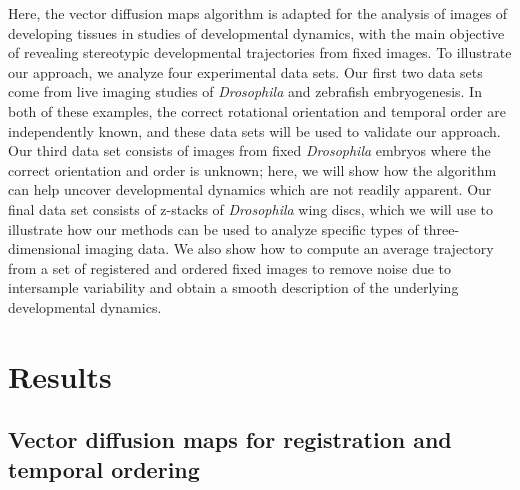 \documentclass[twocolumn, 10pt]{article}
\begin{document}
Here, the vector diffusion maps algorithm is adapted for the analysis of images of developing tissues in studies of developmental dynamics, with the main objective of revealing stereotypic developmental trajectories from fixed images.
%
To illustrate our approach, we analyze four experimental data sets.
%
Our first two data sets come from live imaging studies of {\em Drosophila} and zebrafish embryogenesis.
%
In both of these examples, the correct rotational orientation and temporal order are independently known, and these data sets will be used to validate our approach.
%
Our third data set consists of images from fixed {\em Drosophila} embryos where the correct orientation and order is unknown; here, we will show how the algorithm can help uncover developmental dynamics which are not readily apparent.
%
Our final data set consists of z-stacks of {\em Drosophila} wing discs, which we will use to illustrate how our methods can be used to analyze specific types of three-dimensional imaging data.
%
We also show how to compute an average trajectory from a set of registered and ordered fixed images to remove noise due to intersample variability and obtain a smooth description of the underlying developmental dynamics.

\section*{Results}

\subsection*{Vector diffusion maps for registration and temporal ordering}
\end{document}

